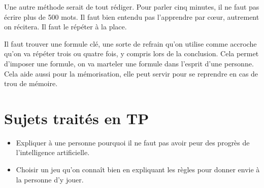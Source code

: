 \documentclass[final, a4paper, 11pt]{article}
\begin{document}
Une autre méthode serait de tout rédiger. Pour parler cinq minutes, il ne faut pas écrire plus de 500 mots. Il faut bien entendu pas l'apprendre par cœur, autrement on récitera. Il faut le répéter à la place.

Il faut trouver une formule clé, une sorte de refrain qu'on utilise comme accroche qu'on va répéter trois ou quatre fois, y compris lors de la conclusion. Cela permet d'imposer une formule, on va marteler une formule dans l'esprit d'une personne. Cela aide aussi pour la mémorisation, elle peut servir pour se reprendre en cas de trou de mémoire.

\section{Sujets traités en TP}
\begin{itemize}
	\item Expliquer à une personne pourquoi il ne faut pas avoir peur des progrès de l'intelligence artificielle.
	\item Choisir un jeu qu'on connaît bien en expliquant les règles pour donner envie à la personne d'y jouer.
\end{itemize}
\end{document}
